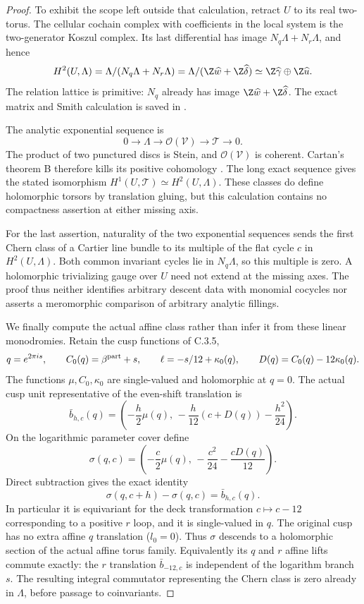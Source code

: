 \begin{proof}
To exhibit the scope left outside that calculation,
retract $U$ to its real two-torus.  The cellular
cochain complex with coefficients in the local
system is the two-generator Koszul complex.
Its last differential has image
$N_q\Lambda+N_r\Lambda$, and hence
\[
 H^2(U,\Lambda)
   =\Lambda/(N_q\Lambda+N_r\Lambda)
   =\Lambda/(\Z\widehat w+\Z\widehat\delta)
   \simeq\Z\widehat\gamma\oplus\Z\widehat u.
\]
The relation lattice is primitive: $N_q$ already
has image $\Z\widehat w+\Z\widehat\delta$.
The exact matrix and Smith calculation is saved
in .

The analytic exponential sequence is
\[
 0\longrightarrow\Lambda\longrightarrow
 \mathcal O(\mathcal V)\longrightarrow
 \mathscr T\longrightarrow0.
\]
The product of two punctured discs is Stein,
and $\mathcal O(\mathcal V)$ is coherent.
Cartan's theorem B therefore kills its positive
cohomology
\citep[Section 5]{Cartan1952B_AB}.
The long exact sequence gives the stated
isomorphism $H^1(U,\mathscr T)\simeq H^2(U,\Lambda)$.
These classes do define holomorphic torsors by
translation gluing, but this calculation contains
no compactness assertion at either missing axis.

For the last assertion, naturality of the two
exponential sequences sends the first Chern class
of a Cartier line bundle to its multiple of the
flat cycle $c$ in $H^2(U,\Lambda)$.  Both common
invariant cycles lie in $N_q\Lambda$, so this
multiple is zero.  A holomorphic trivializing
gauge over $U$ need not extend at the missing
axes.  The proof thus neither identifies
arbitrary descent data with monomial cocycles
nor asserts a meromorphic comparison of
arbitrary analytic fillings.

We finally compute the actual affine class rather
than infer it from these linear monodromies.  Retain
the cusp functions of C.3.5,
\[
 q=e^{2\pi i s},\qquad
 C_0(q)=\beta^{\rm part}+s,\qquad
 \ell=-s/12+\kappa_0(q),
 \qquad D(q)=C_0(q)-12\kappa_0(q).
\]
The functions $\mu,C_0,\kappa_0$ are single-valued
and holomorphic at $q=0$.  The actual cusp unit
representative of the even-shift translation is
\[
 \bar b_{h,c}(q)=
 \left(-\frac h2\mu(q),\,
       -\frac h{12}(c+D(q))-\frac{h^2}{24}\right).
\]
On the logarithmic parameter cover define
\[
 \sigma(q,c)=
 \left(-\frac c2\mu(q),\,
       -\frac{c^2}{24}-\frac{cD(q)}{12}\right).
\]
Direct subtraction gives the exact identity
\[
 \sigma(q,c+h)-\sigma(q,c)=\bar b_{h,c}(q).
\]
In particular it is equivariant for the deck
transformation $c\mapsto c-12$ corresponding to
a positive $r$ loop, and it is single-valued in
$q$.  The original cusp has no extra affine
$q$ translation ($l_0=0$).  Thus $\sigma$ descends
to a holomorphic section of the actual affine
torus family.  Equivalently its $q$ and $r$
affine lifts commute exactly: the $r$ translation
$\bar b_{-12,c}$ is independent of the logarithm
branch $s$.  The resulting integral commutator
representing the Chern class is zero already in
$\Lambda$, before passage to coinvariants.


\end{proof}
